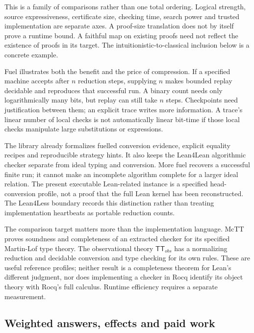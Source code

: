 \documentclass[11pt,a4paper]{article}
\theoremstyle{plain}
\theoremstyle{definition}
\theoremstyle{remark}
\begin{document}
This is a family of comparisons rather than one total ordering. Logical
strength, source expressiveness, certificate size, checking time, search power
and trusted implementation are separate axes. A proof-size translation does
not by itself prove a runtime bound. A faithful map on existing proofs need
not reflect the existence of proofs in its target. The intuitionistic-to-classical
inclusion below is a concrete example.

Fuel illustrates both the benefit and the price of compression. If a specified
machine accepts after $n$ reduction steps, supplying $n$ makes bounded replay
decidable and reproduces that successful run. A binary count needs only
logarithmically many bits, but replay can still take $n$ steps. Checkpoints
need justification between them; an explicit trace writes more information.
A trace's linear number of local checks is not automatically linear bit-time
if those local checks manipulate large substitutions or expressions.

The library already formalizes fuelled conversion evidence, explicit equality
recipes and reproducible strategy hints. It also keeps the Lean4Lean
algorithmic checker separate from ideal typing and conversion. More fuel
recovers a successful finite run; it cannot make an incomplete algorithm
complete for a larger ideal relation. The present executable Lean-related
instance is a specified head-conversion profile, not a proof that the full
Lean kernel has been reconstructed. The Lean4Less boundary records this
distinction rather than treating implementation heartbeats as portable
reduction counts.

The comparison target matters more than the implementation language. McTT
proves soundness and completeness of an extracted checker for its specified
Martin-Lof type theory\cite{McTT}. The observational theory $\mathsf{TT}_{obs}$
has a normalizing reduction and decidable conversion and type checking for its
own rules\cite{TTobs}. These are useful reference profiles; neither result is
a completeness theorem for Lean's different judgment, nor does implementing a
checker in Rocq identify its object theory with Rocq's full calculus. Runtime
efficiency requires a separate measurement.

\subsection{Weighted answers, effects and paid work}
\end{document}
